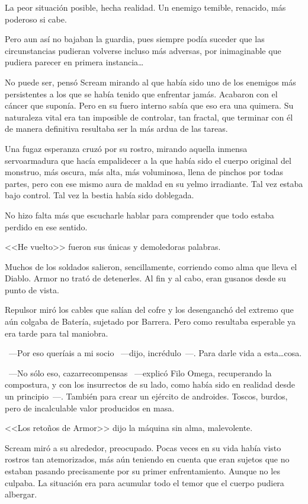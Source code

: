 La peor situación posible, hecha realidad. Un enemigo temible, renacido, más poderoso si cabe.

Pero aun así no bajaban la guardia, pues siempre podía suceder que las circunstancias pudieran volverse incluso más adversas, por inimaginable que pudiera parecer en primera instancia\dots

\fancyparbreak
No puede ser, pensó Scream mirando al que había sido uno de los enemigos más persistentes a los que se había tenido que enfrentar jamás. Acabaron con el cáncer que suponía. Pero en su fuero interno sabía que eso era una quimera. Su naturaleza vital era tan imposible de controlar, tan fractal, que terminar con él de manera definitiva resultaba ser la más ardua de las tareas.

Una fugaz esperanza cruzó por su rostro, mirando aquella inmensa servoarmadura que hacía empalidecer a la que había sido el cuerpo original del monstruo, más oscura, más alta, más voluminosa, llena de pinchos por todas partes, pero con ese mismo aura de maldad en su yelmo irradiante. Tal vez estaba bajo control. Tal vez la bestia había sido doblegada.

No hizo falta más que escucharle hablar para comprender que todo estaba perdido en ese sentido.

<<He vuelto>> fueron sus únicas y demoledoras palabras.

Muchos de los soldados salieron, sencillamente, corriendo como alma que lleva el Diablo. Armor no trató de detenerles. Al fin y al cabo, eran gusanos desde su punto de vista.

Repulsor miró los cables que salían del cofre y los desenganchó del extremo que aún colgaba de Batería, sujetado por Barrera. Pero como resultaba esperable ya era tarde para tal maniobra.

~---Por eso queríais a mi socio ~---dijo, incrédulo~---. Para darle vida a esta\dots cosa.

~---No sólo eso, cazarrecompensas ~---explicó Filo Omega, recuperando la compostura, y con los insurrectos de su lado, como había sido en realidad desde un principio~---. También para crear un ejército de androides. Toscos, burdos, pero de incalculable valor producidos en masa.

<<Los retoños de Armor>> dijo la máquina sin alma, malevolente.

Scream miró a su alrededor, preocupado. Pocas veces en su vida había visto rostros tan atemorizados, más aún teniendo en cuenta que eran sujetos que no estaban pasando precisamente por su primer enfrentamiento. Aunque no les culpaba. La situación era para acumular todo el temor que el cuerpo pudiera albergar.


